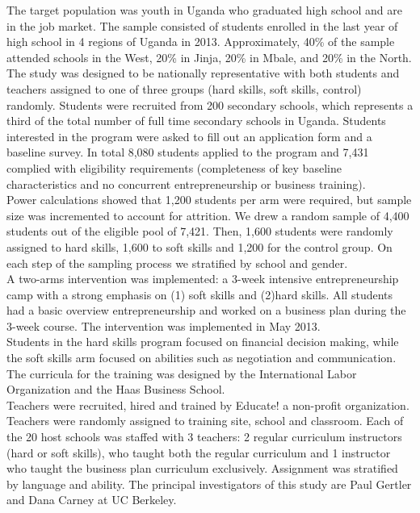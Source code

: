 \documentclass[oneside, notitlepage]{book}
\begin{document}
The target population was youth in Uganda who graduated high school and are in the job market. The sample consisted of students enrolled in the last year of high school in 4 regions of Uganda in 2013. Approximately, 40\% of the sample attended schools in the West, 20\% in Jinja, 20\% in Mbale, and 20\% in the North. The study was designed to be nationally representative with both students and teachers assigned to one of three groups (hard skills, soft skills, control) randomly. Students were recruited from 200 secondary schools, which represents a third of the total number of full time secondary schools in Uganda. Students interested in the program were asked to fill out an application form and a baseline survey. In total 8,080 students applied to the program and 7,431 complied with eligibility requirements (completeness of key baseline characteristics and no concurrent entrepreneurship or business training). \\

Power calculations showed that 1,200 students per arm were required, but sample size was incremented to account for attrition. We drew a random sample of 4,400 students out of the eligible pool of 7,421. Then, 1,600 students were randomly assigned to hard skills, 1,600 to soft skills and 1,200 for the control group. On each step of the sampling process we stratified by school and gender.\\

A two-arms intervention was implemented: a 3-week intensive entrepreneurship camp with a strong emphasis on (1) soft skills and (2)hard skills. All students had a basic overview entrepreneurship and worked on a business plan during the 3-week course. The intervention was implemented in May 2013. \\

Students in the hard skills program focused on financial decision making, while the soft skills arm focused on abilities such as negotiation and communication. The curricula for the training was designed by the International Labor Organization and the Haas Business School.\\

Teachers were recruited, hired and trained by Educate! a non-profit organization. Teachers were randomly assigned to training site, school and classroom. Each of the 20 host schools was staffed with 3 teachers: 2 regular curriculum instructors (hard or soft skills), who taught both the regular curriculum and 1 instructor who taught the business plan curriculum exclusively. Assignment was stratified by language and ability. The principal investigators of this study are Paul Gertler and Dana Carney at UC Berkeley.\\
\end{document}
